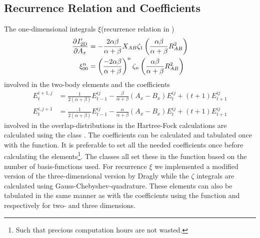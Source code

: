 \subsection{Recurrence Relation and Coefficients}
    The one-dimensional integrals $\xi$(recurrence relation in
    ) 
        \begin{equation}
            \begin{aligned}
                \prd{A_x}[I'_{\text{2D}}] &= -\frac{2\alpha\beta}{\alpha+\beta}
                X_{AB}\zeta_1\left(\frac{\alpha\beta}{\alpha+\beta}R^2_{AB}\right)
                \\
                \xi^n_{00} &= \left(\frac{-2\alpha\beta}{\alpha+\beta}\right)^n
                \zeta_n\left(\frac{\alpha\beta}{\alpha+\beta} R^2_{AB}\right)
            \end{aligned}
        \end{equation}
    involved in the two-body elements and the coefficients
        \begin{equation}
            \begin{aligned}
                E^{i+1,j}_t &= \frac{1}{2(\alpha + \beta)}E^{ij}_{t-1} -
                \frac{\beta}{\alpha+\beta}(A_x - B_x)E^{ij}_t +
                (t+1)E^{ij}_{t+1} \\
                E^{i,j+1}_t &= \frac{1}{2(\alpha + \beta)}E^{ij}_{t-1} -
                \frac{\alpha}{\alpha+\beta}(A_x - B_x)E^{ij}_t +
                (t+1)E^{ij}_{t+1}
            \end{aligned}
        \end{equation}
    involved in the overlap-distributions in the Hartree-Fock calculations are
    calculated using the class . The coefficients can be
    calculated and tabulated once with the 
    function. It is preferable  to set all the needed coefficients once before
    calculating the elements\footnote{Such that precious computation hours are
    not wasted.}. The  classes all set these in the
     function based on the number of
    basis-functions used. For recurrence $\xi$ we implemented a modified
    version of the three-dimensional version by Dragly\cite{draglygithubHF}
    while the $\zeta$ integrals are calculated using
    Gauss-Chebyshev-quadrature\cite{gausschebyshev}. These elements can also be
    tabulated in the same manner as with the coefficients using the function
     and  respectively for
    two- and three dimensions.

